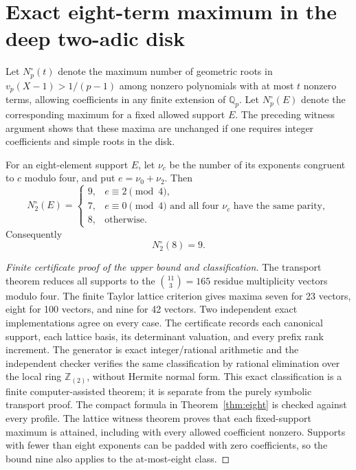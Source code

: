 \section{Exact eight-term maximum in the deep two-adic disk}
Let $N_p^\circ(t)$ denote the maximum number of geometric roots in
$v_p(X-1)>1/(p-1)$ among nonzero polynomials with at most $t$ nonzero
terms, allowing coefficients in any finite extension of $\mathbb Q_p$.
Let $N_p^\circ(E)$ denote the corresponding maximum for a fixed allowed
support $E$. The preceding witness argument shows that these maxima
are unchanged if one requires integer coefficients and simple roots
in the disk.

\begin{theorem}\label{thm:eight}
For an eight-element support $E$, let $\nu_c$ be the number of its
exponents congruent to $c$ modulo four, and put $e=\nu_0+\nu_2$. Then
\[
 N_2^\circ(E)=
 \begin{cases}
 9,&e\equiv2\pmod4,\\
 7,&e\equiv0\pmod4\text{ and all four }\nu_c\text{ have the same parity},\\
 8,&\text{otherwise}.
 \end{cases}
\]
Consequently
\[
 N_2^{\circ}(8)=9.
\]
\end{theorem}
\begin{proof}[Finite certificate proof of the upper bound and classification]
The transport theorem reduces all supports to the $\binom{11}{3}=165$
residue multiplicity vectors modulo four. The finite Taylor lattice
criterion gives maxima seven for 23 vectors, eight for 100 vectors,
and nine for 42 vectors. Two independent exact implementations agree on every case. The certificate records each canonical
support, each lattice basis, its determinant valuation, and every
prefix rank increment. The generator is exact integer/rational
arithmetic and the independent checker verifies the same classification by rational elimination over the local ring $\mathbb Z_{(2)}$, without Hermite normal form.
This exact classification is a finite computer-assisted theorem;
it is separate from the purely symbolic transport proof.
The compact formula in Theorem~\ref{thm:eight} is checked against every
profile. The lattice witness theorem proves that each fixed-support
maximum is attained, including with every allowed coefficient nonzero.
Supports with fewer than eight exponents can be padded with zero
coefficients, so the bound nine also applies to the at-most-eight class.
\end{proof}

